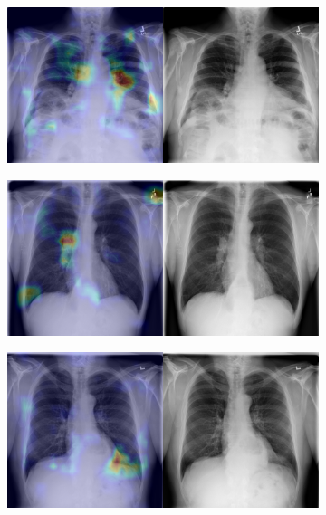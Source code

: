 \begin{figure}[b]
\begin{subfigure}{0.4\textwidth}
    \end{subfigure}
    \begin{subfigure}{0.4\textwidth}
        \centering
        \includegraphics[width=1.0\textwidth]{Chapters/5. Conclusiones/img/Hernia/1_1_00008508_004.png}
    \end{subfigure}
    \begin{subfigure}{0.4\textwidth}
        \centering
        \includegraphics[width=1.0\textwidth]{Chapters/5. Conclusiones/img/Hernia/1_1_00009507_003.png}
    \end{subfigure}
    \begin{subfigure}{0.4\textwidth}
        \centering
        \includegraphics[width=1.0\textwidth]{Chapters/5. Conclusiones/img/Hernia/1_1_00020915_001.png}

\end{subfigure}
\end{figure}
